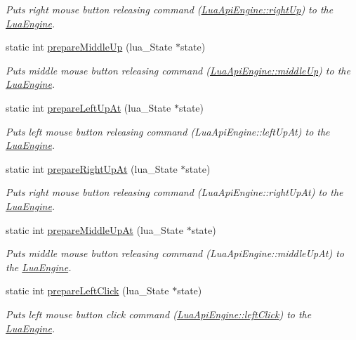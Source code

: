 \begin{DoxyCompactItemize}
\begin{DoxyCompactList}\small\item\em Puts right mouse button releasing command (\hyperlink{class_lua_api_engine_ae8b09733792cc95ca22654be8074bfbf}{Lua\-Api\-Engine\-::right\-Up}) to the \hyperlink{class_lua_engine}{Lua\-Engine}. \end{DoxyCompactList}\item 
static int \hyperlink{class_lua_api_engine_a846fe811b326260da13425a8b9b6f908}{prepare\-Middle\-Up} (lua\-\_\-\-State $\ast$state)
\begin{DoxyCompactList}\small\item\em Puts middle mouse button releasing command (\hyperlink{class_lua_api_engine_a2cd4a53a99e262aa9d5e83a2b34b6538}{Lua\-Api\-Engine\-::middle\-Up}) to the \hyperlink{class_lua_engine}{Lua\-Engine}. \end{DoxyCompactList}\item 
static int \hyperlink{class_lua_api_engine_a6e63e8131106f5e01d445a564e6569f5}{prepare\-Left\-Up\-At} (lua\-\_\-\-State $\ast$state)
\begin{DoxyCompactList}\small\item\em Puts left mouse button releasing command (Lua\-Api\-Engine\-::left\-Up\-At) to the \hyperlink{class_lua_engine}{Lua\-Engine}. \end{DoxyCompactList}\item 
static int \hyperlink{class_lua_api_engine_a63574f6087f18f635b1df170d51391a6}{prepare\-Right\-Up\-At} (lua\-\_\-\-State $\ast$state)
\begin{DoxyCompactList}\small\item\em Puts right mouse button releasing command (Lua\-Api\-Engine\-::right\-Up\-At) to the \hyperlink{class_lua_engine}{Lua\-Engine}. \end{DoxyCompactList}\item 
static int \hyperlink{class_lua_api_engine_aba8972c05819c262e4a9d8dec53b7e8f}{prepare\-Middle\-Up\-At} (lua\-\_\-\-State $\ast$state)
\begin{DoxyCompactList}\small\item\em Puts middle mouse button releasing command (Lua\-Api\-Engine\-::middle\-Up\-At) to the \hyperlink{class_lua_engine}{Lua\-Engine}. \end{DoxyCompactList}\item 
static int \hyperlink{class_lua_api_engine_aa4ec049683c5ca8fe5b317f9daa80cf2}{prepare\-Left\-Click} (lua\-\_\-\-State $\ast$state)
\begin{DoxyCompactList}\small\item\em Puts left mouse button click command (\hyperlink{class_lua_api_engine_ae857b39d951f50a206989c3422cb5494}{Lua\-Api\-Engine\-::left\-Click}) to the \hyperlink{class_lua_engine}{Lua\-Engine}. \end{DoxyCompactList}\item 

\end{DoxyCompactItemize}
